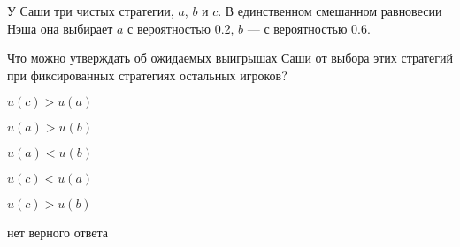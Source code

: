 
\begin{question}
У Саши три чистых стратегии, \(a\), \(b\) и \(c\). В единственном
смешанном равновесии Нэша она выбирает \(a\) с вероятностью 0.2, \(b\)
--- с вероятностью 0.6.

Что можно утверждать об ожидаемых выигрышах Саши от выбора этих
стратегий при фиксированных стратегиях остальных игроков?
\begin{answerlist}
  \item \(u(c) > u(a)\)
  \item \(u(a) > u(b)\)
  \item \(u(a) < u(b)\)
  \item \(u(c) < u(a)\)
  \item \(u(c) > u(b)\)
  \item нет верного ответа
\end{answerlist}
\end{question}


